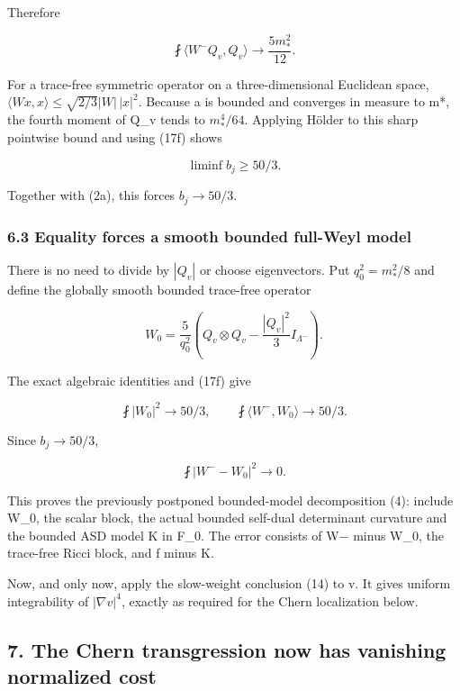 \documentclass[11pt]{article}
\begin{document}
Therefore

\[
 \boxed{\fint\langle W^-Q_v,Q_v\rangle\longrightarrow
                       \frac{5m_*^2}{12}.}
\tag{17f}
\]

For a trace-free symmetric operator on a three-dimensional Euclidean
space, \(\langle Wx,x\rangle\le\sqrt{2/3}|W|\,|x|^2\). Because a is
bounded and converges in measure to m*, the fourth moment of Q\_v tends
to \(m_*^4/64\). Applying Hölder to this sharp pointwise bound and using
(17f) shows

\[
 \liminf b_j\ge50/3.
\tag{17g}
\]

Together with (2a), this forces \(b_j\to50/3\).

\hypertarget{o10strength:equality-forces-a-smooth-bounded-full-weyl-model}{%
\subsubsection{6.3 Equality forces a smooth bounded full-Weyl
model}\label{o10strength:equality-forces-a-smooth-bounded-full-weyl-model}}

There is no need to divide by \(|Q_v|\) or choose eigenvectors. Put
\(q_0^2=m_*^2/8\) and define the globally smooth bounded trace-free
operator

\[
 W_0=\frac5{q_0^2}
       \left(Q_v\otimes Q_v-\frac{|Q_v|^2}{3}I_{\Lambda^-}\right).
\tag{17h}
\]

The exact algebraic identities and (17f) give

\[
 \fint|W_0|^2\longrightarrow50/3,
 \qquad\fint\langle W^-,W_0\rangle\longrightarrow50/3.
\]

Since \(b_j\to50/3\),

\[
 \boxed{\fint|W^--W_0|^2\longrightarrow0.}
\tag{17i}
\]

This proves the previously postponed bounded-model decomposition (4):
include W\_0, the scalar block, the actual bounded self-dual determinant
curvature and the bounded ASD model K in F\_0. The error consists of W−
minus W\_0, the trace-free Ricci block, and f minus K.

Now, and only now, apply the slow-weight conclusion (14) to v. It gives
uniform integrability of \(|\nabla v|^4\), exactly as required for the
Chern localization below.

\hypertarget{o10strength:the-chern-transgression-now-has-vanishing-normalized-cost}{%
\subsection{7. The Chern transgression now has vanishing normalized
cost}\label{o10strength:the-chern-transgression-now-has-vanishing-normalized-cost}}
\end{document}
